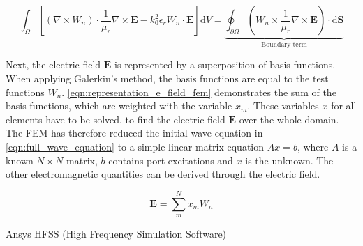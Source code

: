 \begin{equation}
    \int_\Omega \left[ \left(\nabla \times W_n \right)\cdot \frac{1}{\mu_r}\nabla\times \mathbf{E}-k_0^2\epsilon_rW_n\cdot\mathbf{E}\right]\mathrm{d}V=\underbrace{\oint_{\partial\Omega}\left( W_n\times \frac{1}{\mu_r}\nabla\times\mathbf{E}\right)\cdot\mathrm{d}\mathbf{S}}_{\text{Boundary term}}
    \label{eqn:greens_theorem_wave_eqn}
\end{equation}

Next, the electric field $\mathbf{E}$ is represented by a superposition of basis functions. When applying Galerkin's method, the basis functions are equal to the test functions $W_n$. \autoref{eqn:representation_e_field_fem} demonstrates the sum of the basis functions, which are weighted with the variable $x_m$. These variables $x$ for all elements have to be solved, to find the electric field $\mathbf{E}$ over the whole domain. The FEM has therefore reduced the initial wave equation in \autoref{eqn:full_wave_equation} to a simple linear matrix equation $Ax=b$, where $A$ is a known $N\times N$ matrix, $b$ contains port excitations and $x$ is the unknown. The other electromagnetic quantities can be derived through the electric field.

\begin{equation}
    \mathbf{E}=\sum^N_mx_mW_n
    \label{eqn:representation_e_field_fem}
\end{equation}



Ansys HFSS (High Frequency Simulation Software) %



